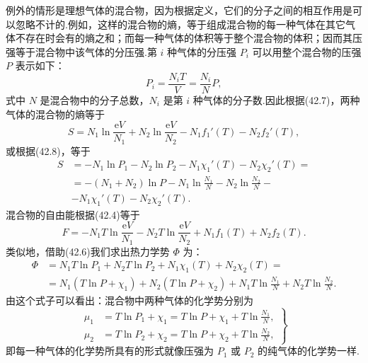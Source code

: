 例外的情形是理想气体的混合物，因为根据定义，它们的分子之间的相互作用是可以忽略不计的.例如，这样的混合物的熵，等于组成混合物的每一种气体在其它气体不存在时会有的熵之和；而每一种气体的体积等于整个混合物的体积；因而其压强等于混合物中该气体的分压强.第 $i$ 种气体的分压强 $P_i$ 可以用整个混合物的压强 $P$ 表示如下：
\begin{equation}
  P_i=\frac{N_iT}{V}=\frac{N_i}{N}P,
\end{equation}
式中 $N$ 是混合物中的分子总数，$N_i$ 是第 $i$ 种气体的分子数.因此根据(42.7)，两种气体的混合物的熵等于
\begin{equation}
  S=N_1\ln\frac{\mathrm{e}V}{N_1}+N_2\ln\frac{\mathrm{e}V}{N_2}
  -N_1f_1'(T)-N_2f_2'(T),
\end{equation}
或根据(42.8)，等于
\begin{equation}
\begin{aligned}
  S&=-N_1\ln P_1-N_2\ln P_2-N_1\chi_1'(T)-N_2\chi_2'(T)=\\
  &=-(N_1+N_2)\ln P-N_1\ln\frac{N_1}{N}-N_2\ln\frac{N_2}{N}-\\
  &-N_1\chi_1'(T)-N_2\chi_2'(T).
\end{aligned}
\end{equation}
混合物的自由能根据(42.4)等于
\begin{equation}
  F=-N_1T\ln\frac{\mathrm{e}V}{N_1}-N_2T\ln\frac{\mathrm{e}V}{N_2}
  +N_1f_1(T)+N_2f_2(T).
\end{equation}
类似地，借助(42.6)我们求出热力学势 $\varPhi$ 为：
\begin{equation}
\begin{aligned}
  \varPhi&=N_1T\ln P_1+N_2T\ln P_2+N_1\chi_1(T)+N_2\chi_2(T)=\\
  &=N_1(T\ln P+\chi_1)+N_2(T\ln P+\chi_2)
  +N_1T\ln\frac{N_1}{N}+N_2T\ln\frac{N_2}{N}.
\end{aligned}
\end{equation}
由这个式子可以看出：混合物中两种气体的化学势分别为
\begin{equation}
\left.\begin{aligned}
  \mu_1&=T\ln P_1+\chi_1=T\ln P+\chi_1+T\ln\frac{N_1}{N},\\
  \mu_2&=T\ln P_2+\chi_2=T\ln P+\chi_2+T\ln\frac{N_2}{N},
\end{aligned}\right\}
\end{equation}
即每一种气体的化学势所具有的形式就像压强为 $P_1$ 或 $P_2$ 的纯气体的化学势一样.

